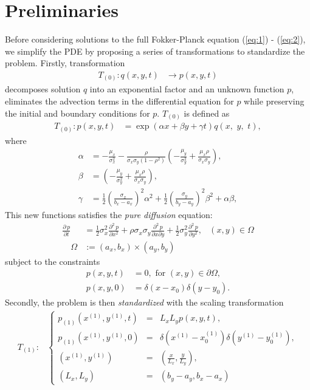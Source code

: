 \section{Preliminaries} \label{sec:approximate-sols}
Before considering solutions to the full Fokker-Planck equation
(\ref{eq:1}) - (\ref{eq:2}), we simplify the PDE by proposing a series
of transformations to standardize the problem. Firstly, transformation
\begin{align}
  T_{(0)} : q(x,y,t) &\to p(x,y,t)
\end{align}
decomposes solution $q$ into an exponential factor and an unknown
function $p$, eliminates the advection terms in the differential
equation for $p$ while preserving the initial and boundary conditions
for $p$. $T_{(0)}$ is defined as
\begin{align}
  T_{(0)}: p(x,y,t) &= \exp(\alpha x + \beta y + \gamma t) q\left( x, \,\, y, \,\, t \right), \label{eq:q-to-p}
\end{align}
where
\begin{align*}
  \alpha &= -\frac{\mu_x}{\sigma_x^2} - \frac{\rho}{\sigma_x\sigma_y(1-\rho^2)}\left( -\frac{\mu_y}{\sigma_y^2} + \frac{\mu_x \rho}{\sigma_x \sigma_y} \right), \\
  \beta &= \left( -\frac{\mu_y}{\sigma_y^2} + \frac{\mu_x \rho}{\sigma_x \sigma_y} \right), \\
  \gamma &= \frac{1}{2}\left( \frac{\sigma_x}{b_x-a_x} \right)^2 \alpha^2 + \frac{1}{2}\left(\frac{\sigma_y}{b_y-a_y}\right)^2 \beta^2 + \alpha\beta,
\end{align*}
This new functions satisfies the \textit{pure diffusion} equation:
\begin{align}
  \frac{\partial\, p}{\partial t} &= \frac{1}{2}\sigma_x^2 \frac{\partial^2\, p}{\partial x^2} + \rho\sigma_x\sigma_y \frac{\partial^2\, p}{\partial x \partial y} + \frac{1}{2}\sigma_y^2 \frac{\partial^2\, p}{\partial y^2}, & (x,y) \in \Omega \label{eq:qq} \\
  \quad \Omega &:= (a_x,b_x) \times (a_y,b_y) \nonumber
\end{align}
subject to the constraints
\begin{align}
  p(x,y,t) &=0,\mbox{ for } (x,y) \in \partial \Omega, \nonumber \\
  p(x,y,0) &= \delta\left( x - x_0 \right) \delta\left(y-y_0\right). \nonumber
\end{align}
Secondly, the problem is then \textit{standardized} with the scaling transformation
\begin{align}
  T_{(1)}: & \left\{ \begin{array}{ccc}
                       p_{(1)}(x^{(1)}, y^{(1)}, t) &=& L_xL_y p(x,y,t), \\
                       p_{(1)}(x^{(1)}, y^{(1)}, 0) &=& \delta(x^{(1)}-x_0^{(1)}) \delta(y^{(1)}-y_0^{(1)}), \\
                       (x^{(1)}, y^{(1)}) &=& \left(\frac{x}{L_x}, \frac{y}{L_y} \right), \\
                       (L_x,L_y) &=& \left(b_y - a_y, b_x - a_x\right)
                     \end{array} \right.
\end{align}
